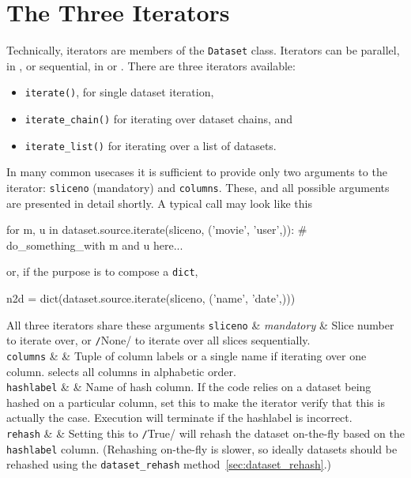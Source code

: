 \section{The Three Iterators}
Technically, iterators are members of the \texttt{Dataset} class.
Iterators can be parallel, in \analysis, or sequential, in \prepare
or \synthesis.  There are three iterators available:
\begin{itemize}
\item [] \texttt{iterate()}, for single dataset iteration,
\item [] \texttt{iterate\_chain()} for iterating over dataset chains, and
\item [] \texttt{iterate\_list()} for iterating over a list of datasets.
\end{itemize}
In many common usecases it is sufficient to provide only two arguments
to the iterator: \texttt{sliceno} (mandatory) and \texttt{columns}.
These, and all possible arguments are presented in detail shortly. A
typical call may look like this
\begin{python}
for m, u in dataset.source.iterate(sliceno, ('movie', 'user',)):
    # do_something_with m and u here...
\end{python}
or, if the purpose is to compose a \texttt{dict},
\begin{python}
n2d = dict(dataset.source.iterate(sliceno, ('name', 'date',)))
\end{python}

All three iterators share these arguments
\starttable
  \RP \texttt{sliceno} & \textsl{mandatory} & Slice number to iterate
  over, or \texttt/None/ to iterate over all slices
  sequentially. \\[1ex]

  \RP \texttt{columns} & \pyNone & Tuple of column labels or a single name if
  iterating over one column.  \pyNone selects all columns in alphabetic order.\\[1ex]

  \RP \texttt{hashlabel} & \pyNone & Name of hash column.  If the code relies
  on a dataset being hashed on a particular column, set this to make
  the iterator verify that this is actually the case.  Execution will terminate
  if the hashlabel is incorrect.\\[1ex]

  \RP \texttt{rehash} & \pyFalse & Setting this
  to \texttt/True/ will rehash the dataset on-the-fly
  based on the \texttt{hashlabel} column.  (Rehashing on-the-fly is
  slower, so ideally datasets should be rehashed using
  the \texttt{dataset\_rehash} method~\ref{sec:dataset_rehash}.)\\[1ex]
  
